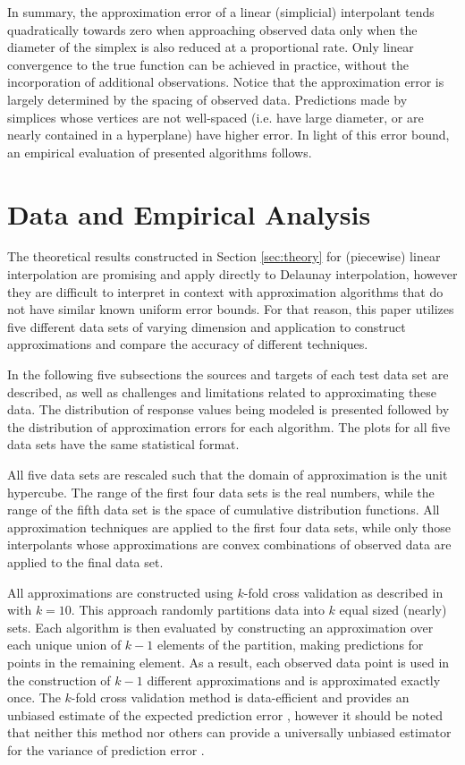 \documentclass[smallextended,final]{svjour3}  %
\begin{document}
In summary, the approximation error of a linear (simplicial)
interpolant tends quadratically towards zero when approaching observed
data only when the diameter of the simplex is also reduced at a
proportional rate.  Only linear convergence to the true function can
be achieved in practice, without the incorporation of additional
observations. Notice that the approximation error is largely
determined by the spacing of observed data. Predictions made by
simplices whose vertices are not well-spaced (i.e. have large
diameter, or are nearly contained in a hyperplane) have higher
error. In light of this error bound, an empirical evaluation of
presented algorithms follows.

\vspace{-2mm}
\section{Data and Empirical Analysis}
\label{sec:data}

The theoretical results constructed in Section \ref{sec:theory} for
(piecewise) linear interpolation are promising and apply directly to
Delaunay interpolation, however they are difficult to interpret in
context with approximation algorithms that do not have similar known
uniform error bounds. For that reason, this paper utilizes five
different data sets of varying dimension and application to construct
approximations and compare the accuracy of different techniques.

In the following five subsections the sources and targets of each test
data set are described, as well as challenges and limitations related
to approximating these data. The distribution of response values being
modeled is presented followed by the distribution of approximation
errors for each algorithm. The plots for all five data sets have the
same statistical format.

All five data sets are rescaled such that the domain of approximation
is the unit hypercube. The range of the first four data sets is the
real numbers, while the range of the fifth data set is the space of
cumulative distribution functions. All approximation techniques are
applied to the first four data sets, while only those interpolants
whose approximations are convex combinations of observed data are
applied to the final data set.

All approximations are constructed using $k$-fold cross validation as
described in \cite{kohavi1995study} with $k=10$. This approach
randomly partitions data into $k$ equal sized (nearly) sets. Each
algorithm is then evaluated by constructing an approximation over each
unique union of $k-1$ elements of the partition, making predictions
for points in the remaining element. As a result, each observed data
point is used in the construction of $k-1$ different approximations
and is approximated exactly once. The $k$-fold cross validation method
is data-efficient and provides an unbiased estimate of the expected
prediction error \cite{kohavi1995study}, however it should be noted
that neither this method nor others can provide a universally unbiased
estimator for the variance of prediction error \cite{bengio2004no}.
\end{document}
